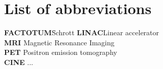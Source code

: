 \documentclass[12pt,a4paper]{report}
\begin{document}
\newpage
\appendix

\chapter*{List of abbreviations}

\begin{tabbing}
	\textbf{FACTOTUM}\hspace{1cm}\=Schrott\kill
	\textbf{LINAC}\>Linear accelerator \\
	\textbf{MRI} \> Magnetic Resonance Imaging\\
    \textbf{PET} \> Positron emission tomography\\
    \textbf{CINE} \> ...\\
\end{tabbing}

\newpage


\renewcommand{\baselinestretch}{1.3}
\small\normalsize

\listoffigures

\renewcommand{\baselinestretch}{1}
\small\normalsize

\newpage


\renewcommand{\baselinestretch}{1.3}
\small\normalsize

\listoftables

\renewcommand{\baselinestretch}{1}
\small\normalsize

\newpage

\end{document}
